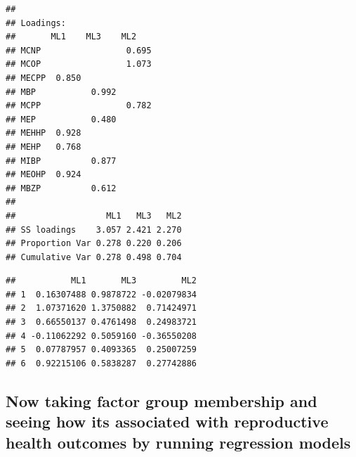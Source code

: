 \documentclass[
]{article}
\newenvironment{Shaded}{\begin{snugshade}}{\end{snugshade}}
\newcommand{\CommentTok}[1]{\textcolor[rgb]{0.56,0.35,0.01}{\textit{#1}}}
\newcommand{\FunctionTok}[1]{\textcolor[rgb]{0.13,0.29,0.53}{\textbf{#1}}}
\newcommand{\NormalTok}[1]{#1}
\newcommand{\OtherTok}[1]{\textcolor[rgb]{0.56,0.35,0.01}{#1}}
\newcommand{\SpecialCharTok}[1]{\textcolor[rgb]{0.81,0.36,0.00}{\textbf{#1}}}
\newcommand{\StringTok}[1]{\textcolor[rgb]{0.31,0.60,0.02}{#1}}
\begin{document}
\begin{verbatim}
## 
## Loadings:
##       ML1    ML3    ML2   
## MCNP                 0.695
## MCOP                 1.073
## MECPP  0.850              
## MBP           0.992       
## MCPP                 0.782
## MEP           0.480       
## MEHHP  0.928              
## MEHP   0.768              
## MIBP          0.877       
## MEOHP  0.924              
## MBZP          0.612       
## 
##                  ML1   ML3   ML2
## SS loadings    3.057 2.421 2.270
## Proportion Var 0.278 0.220 0.206
## Cumulative Var 0.278 0.498 0.704
\end{verbatim}

\begin{Shaded}
\end{Shaded}

\begin{verbatim}
##           ML1       ML3         ML2
## 1  0.16307488 0.9878722 -0.02079834
## 2  1.07371620 1.3750882  0.71424971
## 3  0.66550137 0.4761498  0.24983721
## 4 -0.11062292 0.5059160 -0.36550208
## 5  0.07787957 0.4093365  0.25007259
## 6  0.92215106 0.5838287  0.27742886
\end{verbatim}

\subsection{Now taking factor group membership and seeing how its
associated with reproductive health outcomes by running regression
models}\label{now-taking-factor-group-membership-and-seeing-how-its-associated-with-reproductive-health-outcomes-by-running-regression-models}

\begin{Shaded}
\end{Shaded}
\end{document}
